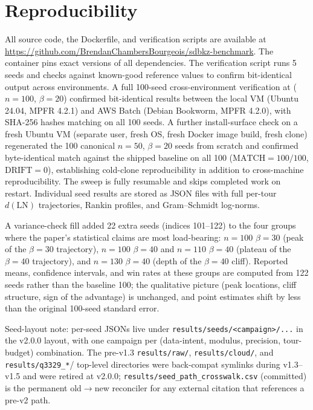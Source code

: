 \documentclass[journal=cic,version=preprint]{iacrj}
\begin{document}
\section{Reproducibility}
\label{sec:repro}

All source code, the Dockerfile, and verification scripts are available at \url{https://github.com/BrendanChambersBourgeois/sdbkz-benchmark}. The container pins exact versions of all dependencies. The verification script runs 5 seeds and checks against known-good reference values to confirm bit-identical output across environments. A full 100-seed cross-environment verification at ($n=100$, $\beta=20$) confirmed bit-identical results between the local VM (Ubuntu 24.04, MPFR 4.2.1) and AWS Batch (Debian Bookworm, MPFR 4.2.0), with SHA-256 hashes matching on all 100 seeds. A further install-surface check on a fresh Ubuntu VM (separate user, fresh OS, fresh Docker image build, fresh clone) regenerated the 100 canonical $n=50$, $\beta=20$ seeds from scratch and confirmed byte-identical match against the shipped baseline on all 100 ($\mathrm{MATCH}=100/100$, $\mathrm{DRIFT}=0$), establishing cold-clone reproducibility in addition to cross-machine reproducibility. The sweep is fully resumable and skips completed work on restart. Individual seed results are stored as JSON files with full per-tour $d(\mathrm{LN})$ trajectories, Rankin profiles, and Gram--Schmidt log-norms.

A variance-check fill added 22 extra seeds (indices 101--122) to the four groups where the paper's statistical claims are most load-bearing: $n=100$ $\beta=30$ (peak of the $\beta=30$ trajectory), $n=100$ $\beta=40$ and $n=110$ $\beta=40$ (plateau of the $\beta=40$ trajectory), and $n=130$ $\beta=40$ (depth of the $\beta=40$ cliff). Reported means, confidence intervals, and win rates at these groups are computed from 122 seeds rather than the baseline 100; the qualitative picture (peak locations, cliff structure, sign of the advantage) is unchanged, and point estimates shift by less than the original 100-seed standard error.

Seed-layout note: per-seed JSONs live under \texttt{results/seeds/<campaign>/...} in the v2.0.0 layout, with one campaign per (data-intent, modulus, precision, tour-budget) combination. The pre-v1.3 \texttt{results/raw/}, \texttt{results/cloud/}, and \texttt{results/q3329\_*}/ top-level directories were back-compat symlinks during v1.3--v1.5 and were retired at v2.0.0; \texttt{results/seed\_path\_crosswalk.csv} (committed) is the permanent old$\to$new reconciler for any external citation that references a pre-v2 path.
\end{document}
